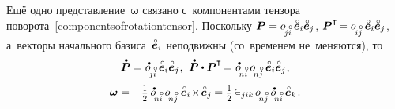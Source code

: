 \begin{otherlanguage}{russian}
Ещё одно представление~$\bm{\omega}$ связано с~компонентами тензора поворота~\eqref{componentsofrotationtensor}. Поскольку ${\bm{P} = \cosinematrix{\!j\mathcircabove{i}} \hspace{0.4ex} \mathcircabove{\bm{e}}_i \mathcircabove{\bm{e}}_j}$, ${\bm{P}^{\T} \hspace{-0.32ex} = \cosinematrix{\hspace{-0.2ex}i\mathcircabove{j}} \hspace{0.4ex} \mathcircabove{\bm{e}}_i \mathcircabove{\bm{e}}_j}$, а~векторы начального базиса~${\mathcircabove{\bm{e}}_i}$ неподвижны (со~временем не~меняются), то
\nopagebreak\vspace{0.25em}\[ \mathdotabove{\bm{P}} = \cosinematrixdotted{\!j\mathcircabove{i}} \hspace{0.4ex} \mathcircabove{\bm{e}}_i \mathcircabove{\bm{e}}_j \hspace{0.1ex}, \:\,
\mathdotabove{\bm{P}} \dotp \bm{P}^{\T} \hspace{-0.32ex} = \hspace{0.1ex} \cosinematrixdotted{\hspace{-0.4ex}n\mathcircabove{i}} \hspace{0.4ex}  \cosinematrix{\hspace{-0.4ex}n\mathcircabove{j}} \hspace{0.4ex} \mathcircabove{\bm{e}}_i \mathcircabove{\bm{e}}_j \hspace{0.1ex}, \]
\nopagebreak\vspace{-0.64em}\begin{equation}
\bm{\omega} = - \hspace{0.1ex} \smalldisplaystyleonehalf \hspace{0.4ex} \cosinematrixdotted{\hspace{-0.4ex}n\mathcircabove{i}} \hspace{0.4ex} \cosinematrix{\hspace{-0.4ex}n\mathcircabove{j}} \hspace{0.5ex} \mathcircabove{\bm{e}}_i \hspace{-0.3ex}\times\hspace{-0.3ex} \mathcircabove{\bm{e}}_j \hspace{-0.1ex} =
\smalldisplaystyleonehalf \hspace{0.2ex} \levicivita_{jik} \hspace{0.32ex} \cosinematrix{\hspace{-0.4ex}n\mathcircabove{j}} \hspace{0.4ex} \cosinematrixdotted{\hspace{-0.4ex}n\mathcircabove{i}} \hspace{0.4ex} \mathcircabove{\bm{e}}_k \hspace{0.2ex}.
\end{equation}


\end{otherlanguage}
